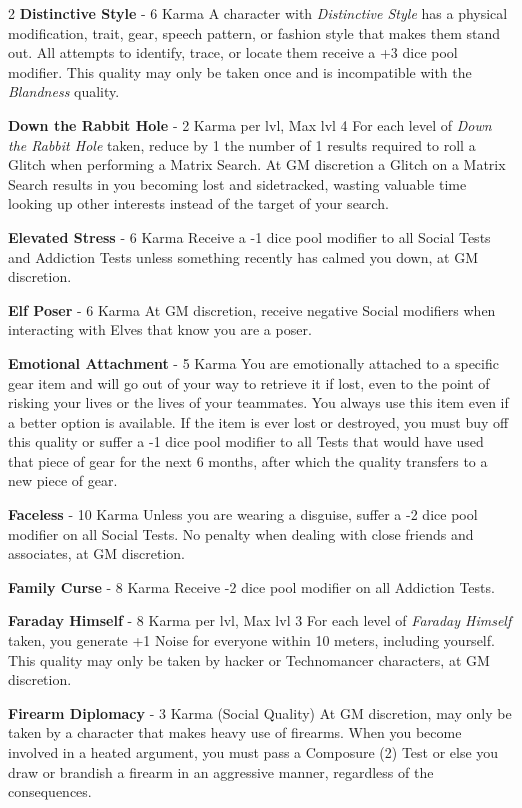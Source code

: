 \documentclass[
  oneside]{article}
\begin{document}
\begin{multicols}{2}
\textbf{Distinctive Style} - 6 Karma A character
with \emph{Distinctive Style} has a physical
modification, trait, gear, speech pattern, or
fashion style that makes them stand out. All
attempts to identify, trace, or locate them
receive a +3 dice pool modifier. This quality may
only be taken once and is incompatible with the
\emph{Blandness} quality.

\textbf{Down the Rabbit Hole} - 2 Karma per lvl,
Max lvl 4 For each level of \emph{Down the Rabbit
Hole} taken, reduce by 1 the number of 1 results
required to roll a Glitch when performing a Matrix
Search. At GM discretion a Glitch on a Matrix
Search results in you becoming lost and
sidetracked, wasting valuable time looking up
other interests instead of the target of your
search.

\textbf{Elevated Stress} - 6 Karma Receive a -1
dice pool modifier to all Social Tests and
Addiction Tests unless something recently has
calmed you down, at GM discretion.

\textbf{Elf Poser} - 6 Karma At GM discretion,
receive negative Social modifiers when interacting
with Elves that know you are a poser.

\textbf{Emotional Attachment} - 5 Karma You are
emotionally attached to a specific gear item and
will go out of your way to retrieve it if lost,
even to the point of risking your lives or the
lives of your teammates. You always use this item
even if a better option is available. If the item
is ever lost or destroyed, you must buy off this
quality or suffer a -1 dice pool modifier to all
Tests that would have used that piece of gear for
the next 6 months, after which the quality
transfers to a new piece of gear.

\textbf{Faceless} - 10 Karma Unless you are
wearing a disguise, suffer a -2 dice pool modifier
on all Social Tests. No penalty when dealing with
close friends and associates, at GM discretion.

\textbf{Family Curse} - 8 Karma Receive -2 dice
pool modifier on all Addiction Tests.

\textbf{Faraday Himself} - 8 Karma per lvl, Max
lvl 3 For each level of \emph{Faraday Himself}
taken, you generate +1 Noise for everyone within
10 meters, including yourself. This quality may
only be taken by hacker or Technomancer
characters, at GM discretion.

\textbf{Firearm Diplomacy} - 3 Karma (Social
Quality) At GM discretion, may only be taken by a
character that makes heavy use of firearms. When
you become involved in a heated argument, you must
pass a Composure (2) Test or else you draw or
brandish a firearm in an aggressive manner,
regardless of the consequences.


\end{multicols}
\end{document}
